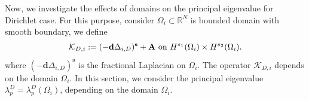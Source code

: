 \documentclass[a4paper,11pt]{amsart}
\newtheorem{lemma}[theorem]{Lemma}
\theoremstyle{definition}
\def\R{\mathbb{R}}
\def\O{\Omega}
\numberwithin{equation}{section}
\theoremstyle{definition}
\def\O{\Omega}
\begin{document}
Now, we investigate the effects of domains on the principal eigenvalue for Dirichlet case. For this purpose, consider $\O_i\subset \R^N$ is bounded domain with smooth boundary,  we define
\begin{align*}
\mathcal{K}_{D,i}:=(-\textbf{d}\Delta_{i,D})^{\textbf{s}} + {\bf A}\text{ on }H^{s_1}(\O_i)\times H^{s_2}(\O_i).
\end{align*}
where $(-\textbf{d}\Delta_{i,D})^{\textbf{s}}$ is the fractional Laplacian on $\O_i$. The operator $\mathcal{K}_{D,i}$ depends on the domain $\O_i$. In this section, we consider the principal eigenvalue $\lambda^D_p=\lambda^D_p(\O_i)$, depending on the domain $\O_i$.
%
%
%
%
%
%
\end{document}
